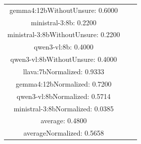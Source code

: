 \documentclass[a4paper]{article}
\begin{document}
\begin{tabular}{ccc}
gemma4:12bWithoutUnsure: 0.6000 \\ ministral-3:8b: 0.2200 \\ ministral-3:8bWithoutUnsure: 0.2200 \\ qwen3-vl:8b: 0.4000 \\ qwen3-vl:8bWithoutUnsure: 0.4000 \\ llava:7bNormalized: 0.9333 \\ gemma4:12bNormalized: 0.7200 \\ qwen3-vl:8bNormalized: 0.5714 \\ ministral-3:8bNormalized: 0.0385 \\ average: 0.4800 \\ averageNormalized: 0.5658 \end{minipage}\\
\end{tabular}

\vspace{5mm}
\end{document}
